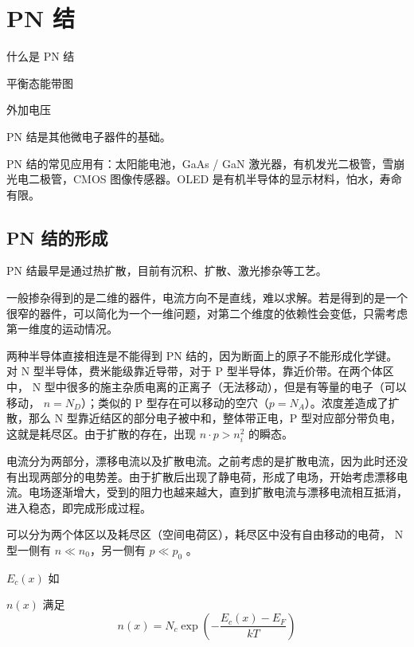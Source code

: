 \documentclass[cn,11pt,chinese,black,simple]{../elegantbook}
\begin{document}
\fi 
\def\chapname{01pnjunction}

\chapter{PN 结}

\begin{introduction}
    \item 什么是 PN 结
    \item 平衡态能带图
    \item 外加电压
\end{introduction}

PN 结是其他微电子器件的基础。

PN 结的常见应用有：太阳能电池，GaAs / GaN 激光器，有机发光二极管，雪崩光电二极管，CMOS 图像传感器。OLED 是有机半导体的显示材料，怕水，寿命有限。

\section{PN 结的形成}

PN 结最早是通过热扩散，目前有沉积、扩散、激光掺杂等工艺。

一般掺杂得到的是二维的器件，电流方向不是直线，难以求解。若是得到的是一个很窄的器件，可以简化为一个一维问题，对第二个维度的依赖性会变低，只需考虑第一维度的运动情况。

两种半导体直接相连是不能得到 PN 结的，因为断面上的原子不能形成化学键。对 N 型半导体，费米能级靠近导带，对于 P 型半导体，靠近价带。在两个体区中， N 型中很多的施主杂质电离的正离子（无法移动），但是有等量的电子（可以移动， \(n = N_D\)）；类似的 P 型存在可以移动的空穴（\(p = N_A\)）。浓度差造成了扩散，那么 N 型靠近结区的部分电子被中和，整体带正电，P 型对应部分带负电，这就是耗尽区。由于扩散的存在，出现 \(n \cdot p > n_i^2\) 的瞬态。

电流分为两部分，漂移电流以及扩散电流。之前考虑的是扩散电流，因为此时还没有出现两部分的电势差。由于扩散后出现了静电荷，形成了电场，开始考虑漂移电流。电场逐渐增大，受到的阻力也越来越大，直到扩散电流与漂移电流相互抵消，进入稳态，即完成形成过程。

可以分为两个体区以及耗尽区（空间电荷区），耗尽区中没有自由移动的电荷， N 型一侧有 \(n \ll n_0\)，另一侧有 \(p \ll p_0\) 。

\(E_c(x)\) 如


\(n(x)\) 满足 \[n(x) = N_c \exp(-\frac{E_c(x)-E_F}{k T})\] 
\end{document}
